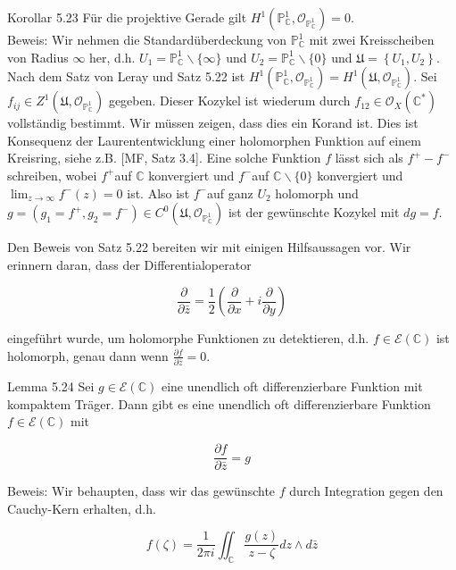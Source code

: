 \documentclass[10pt, letterpaper]{article}
\begin{document}
Korollar 5.23 Für die projektive Gerade gilt $H^{1}\left(\mathbb{P}_{\mathbb{C}}^{1}, \mathcal{O}_{\mathbb{P}_{\mathbb{C}}^{1}}\right)=0$.\\
Beweis: Wir nehmen die Standardüberdeckung von $\mathbb{P}_{\mathbb{C}}^{1}$ mit zwei Kreisscheiben von Radius $\infty$ her, d.h. $U_{1}=\mathbb{P}_{\mathbb{C}}^{1} \backslash\{\infty\}$ und $U_{2}=\mathbb{P}_{\mathbb{C}}^{1} \backslash\{0\}$ und $\mathfrak{U}=\left\{U_{1}, U_{2}\right\}$. Nach dem Satz von Leray und Satz 5.22 ist $H^{1}\left(\mathbb{P}_{\mathbb{C}}^{1}, \mathcal{O}_{\mathbb{P}_{\mathbb{C}}^{1}}\right)=H^{1}\left(\mathfrak{U}, \mathcal{O}_{\mathbb{P}_{\mathbb{C}}^{1}}\right)$. Sei $f_{i j} \in Z^{1}\left(\mathfrak{U}, \mathcal{O}_{\mathbb{P}_{\mathbb{C}}^{1}}\right)$ gegeben. Dieser Kozykel ist wiederum durch $f_{12} \in \mathcal{O}_{X}\left(\mathbb{C}^{*}\right)$ vollständig bestimmt. Wir müssen zeigen, dass dies ein Korand ist. Dies ist Konsequenz der Laurententwicklung einer holomorphen Funktion auf einem Kreisring, siehe z.B. [MF, Satz 3.4]. Eine solche Funktion $f$ lässt sich als $f^{+}-f^{-}$ schreiben, wobei $f^{+}$auf $\mathbb{C}$ konvergiert und $f^{-}$auf $\mathbb{C} \backslash\{0\}$ konvergiert und $\lim _{z \rightarrow \infty} f^{-}(z)=0$ ist. Also ist $f^{-}$auf ganz $U_{2}$ holomorph und $g=\left(g_{1}=\right. \left.f^{+}, g_{2}=f^{-}\right) \in C^{0}\left(\mathfrak{U}, \mathcal{O}_{\mathbb{P}_{\mathbb{C}}^{1}}\right)$ ist der gewünschte Kozykel mit $d g=f$.

Den Beweis von Satz 5.22 bereiten wir mit einigen Hilfsaussagen vor. Wir erinnern daran, dass der Differentialoperator

$$
\frac{\partial}{\partial \bar{z}}=\frac{1}{2}\left(\frac{\partial}{\partial x}+i \frac{\partial}{\partial y}\right)
$$

eingeführt wurde, um holomorphe Funktionen zu detektieren, d.h. $f \in \mathcal{E}(\mathbb{C})$ ist holomorph, genau dann wenn $\frac{\partial f}{\partial \bar{z}}=0$.

Lemma 5.24 Sei $g \in \mathcal{E}(\mathbb{C})$ eine unendlich oft differenzierbare Funktion mit kompaktem Träger. Dann gibt es eine unendlich oft differenzierbare Funktion $f \in \mathcal{E}(\mathbb{C})$ mit

$$
\frac{\partial f}{\partial \bar{z}}=g
$$

Beweis: Wir behaupten, dass wir das gewünschte $f$ durch Integration gegen den Cauchy-Kern erhalten, d.h.

$$
f(\zeta)=\frac{1}{2 \pi i} \iint_{\mathbb{C}} \frac{g(z)}{z-\zeta} d z \wedge d \bar{z}
$$
\end{document}
